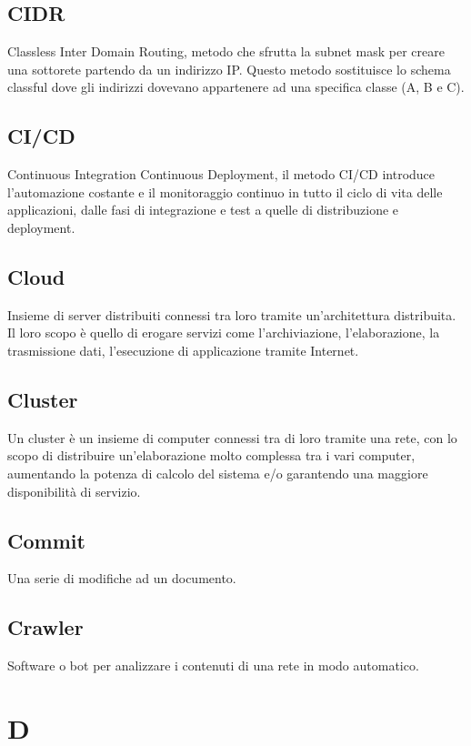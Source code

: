 \documentclass{classes/base}
\begin{document}
        \subsection*{CIDR}
        Classless Inter Domain Routing, metodo che sfrutta la subnet mask per creare una sottorete partendo da un indirizzo IP.  Questo metodo sostituisce lo schema classful dove gli indirizzi dovevano appartenere ad una specifica classe (A, B e C).
    
        \subsection*{CI/CD}
        Continuous Integration Continuous Deployment, il metodo CI/CD introduce l'automazione costante e il monitoraggio continuo in tutto il ciclo di vita delle applicazioni, dalle fasi di integrazione e test a quelle di distribuzione e deployment.
    
        \subsection*{Cloud}
        Insieme di server distribuiti connessi tra loro tramite un'architettura distribuita. Il loro scopo è quello di erogare servizi come l'archiviazione, l'elaborazione, la trasmissione dati, l'esecuzione di applicazione tramite Internet.
        
        \subsection*{Cluster}
        Un cluster è un insieme di computer connessi tra di loro tramite una rete, con lo scopo di distribuire un'elaborazione molto complessa tra i vari computer, aumentando la potenza di calcolo del sistema e/o garantendo una maggiore disponibilità di servizio.
    
        \subsection*{Commit}
        Una serie di modifiche ad un documento.
        
        \subsection*{Crawler}
        Software o bot per analizzare i contenuti di una rete in modo automatico.
        
        \newpage  
    \section{D}
\end{document}
